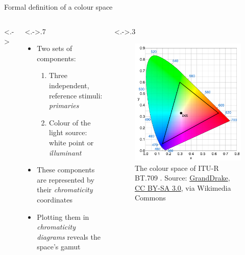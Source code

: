 \documentclass[aspectratio=169,handout,usepdftitle=false]{fireshonks}
\begin{document}
\begin{frame}{Formal definition of a colour space}
    \begin{columns}<.->
        \begin{column}<.->{.7\textwidth}
            \begin{itemize}
                \item Two sets of components:
                      \begin{enumerate}
                          \item Three independent, reference stimuli: \emph{primaries}
                          \item Colour of the light source: white point or \emph{illuminant}
                      \end{enumerate}
                \item These components are represented by their \emph{chromaticity} coordinates
                \item Plotting them in \emph{chromaticity diagrams} reveals the space's gamut
            \end{itemize}
        \end{column}
        \begin{column}<.->{.3\textwidth}
            \begin{figure}
                \includegraphics[width=\columnwidth,keepaspectratio]{figures/bt709.pdf}
                \caption*{The colour space of ITU-R BT.709 \parencite*{BT709}. Source: \href{https://commons.wikimedia.org/wiki/File:CIExy1931_Rec_709.svg}{GrandDrake}, \href{http://creativecommons.org/licenses/by-sa/3.0/}{CC BY-SA 3.0}, via Wikimedia Commons}
            \end{figure}
        \end{column}
    \end{columns}
\end{frame}
\end{document}
